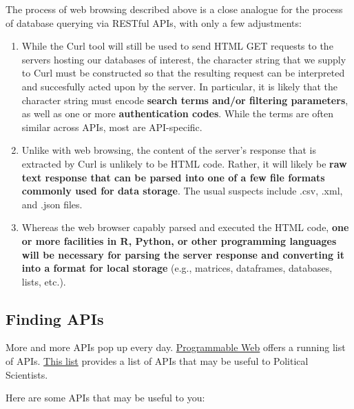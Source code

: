\documentclass[]{book}
\begin{document}
The process of web browsing described above is a close analogue for the
process of database querying via RESTful APIs, with only a few
adjustments:

\begin{enumerate}
\def\labelenumi{\arabic{enumi}.}
\item
  While the Curl tool will still be used to send HTML GET requests to
  the servers hosting our databases of interest, the character string
  that we supply to Curl must be constructed so that the resulting
  request can be interpreted and succesfully acted upon by the server.
  In particular, it is likely that the character string must encode
  \textbf{search terms and/or filtering parameters}, as well as one or
  more \textbf{authentication codes}. While the terms are often similar
  across APIs, most are API-specific.
\item
  Unlike with web browsing, the content of the server's response that is
  extracted by Curl is unlikely to be HTML code. Rather, it will likely
  be \textbf{raw text response that can be parsed into one of a few file
  formats commonly used for data storage}. The usual suspects include
  .csv, .xml, and .json files.
\item
  Whereas the web browser capably parsed and executed the HTML code,
  \textbf{one or more facilities in R, Python, or other programming
  languages will be necessary for parsing the server response and
  converting it into a format for local storage} (e.g., matrices,
  dataframes, databases, lists, etc.).
\end{enumerate}

\subsection{Finding APIs}\label{finding-apis}

More and more APIs pop up every day.
\href{https://www.programmableweb.com/apis/directory}{Programmable Web}
offers a running list of APIs.
\href{https://ucsd.libguides.com/c.php?g=90743\&p=3202435}{This list}
provides a list of APIs that may be useful to Political Scientists.

Here are some APIs that may be useful to you:
\end{document}
